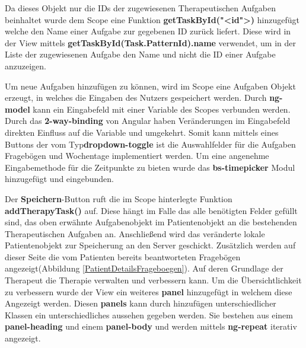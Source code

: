 Da dieses Objekt nur die IDs der zugewiesenen Therapeutischen Aufgaben beinhaltet wurde dem Scope eine Funktion \textbf{getTaskById("<id">)} hinzugefügt welche den Name einer Aufgabe zur gegebenen ID zurück liefert. Diese wird in der View mittels \textbf{getTaskById(Task.PatternId).name} verwendet, um in der Liste der zugewiesenen Aufgabe den Name und nicht die ID einer Aufgabe anzuzeigen.

Um neue Aufgaben hinzufügen zu können, wird im Scope eine Aufgaben Objekt erzeugt, in welches die Eingaben des Nutzers gespeichert werden. Durch \textbf{ng-model} kann ein Eingabefeld mit einer Variable des Scopes verbunden werden. Durch das \textbf{2-way-binding} von Angular haben Veränderungen im Eingabefeld direkten Einfluss auf die Variable und umgekehrt. Somit kann mittels eines Buttons der vom Typ\textbf{dropdown-toggle} ist die Auswahlfelder für die Aufgaben Fragebögen und Wochentage implementiert werden.
Um eine angenehme Eingabemethode für die Zeitpunkte zu bieten wurde das \textbf{bs-timepicker} Modul hinzugefügt und eingebunden.

Der \textbf{Speichern}-Button ruft die im Scope hinterlegte Funktion \textbf{addTherapyTask()} auf. Diese hängt im Falle das alle benötigten Felder gefüllt sind, das oben erwähnte Aufgabenobjekt im Patientenobjekt an die bestehenden Therapeutischen Aufgaben an. Anschließend wird das veränderte lokale Patientenobjekt zur Speicherung an den Server geschickt.
Zusätzlich werden auf dieser Seite die vom Patienten bereits beantworteten Fragebögen angezeigt(Abbildung \ref{PatientDetailsFrageboegen}). Auf deren Grundlage der Therapeut die Therapie verwalten und verbessern kann. Um die Übersichtlichkeit zu verbessern wurde der View ein weiteres \textbf{panel} hinzugefügt in welchem diese Angezeigt werden. Diesen \textbf{panels} kann durch hinzufügen unterschiedlicher Klassen ein unterschiedliches aussehen gegeben werden. Sie bestehen aus einem \textbf{panel-heading} und einem \textbf{panel-body} und werden mittels \textbf{ng-repeat} iterativ angezeigt. 

